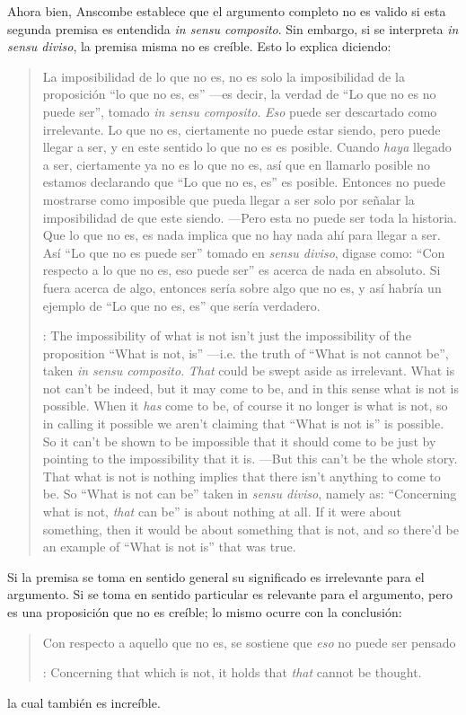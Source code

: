 Ahora bien, Anscombe establece que el argumento completo no es valido si esta segunda premisa es entendida \emph{in sensu composito}. Sin embargo, si se interpreta \emph{in sensu diviso}, la premisa misma no es creíble. Esto lo explica diciendo: \blockquote[{\cite[vii]{anscombe1981parmenides}}: The impossibility of what is not isn't just the impossibility of the proposition ``What is not, is'' ---i.e. the truth of ``What is not cannot be'', taken \emph{in sensu composito}. \emph{That} could be swept aside as irrelevant. What is not can't be indeed, but it may come to be, and in this sense what is not is possible. When it \emph{has} come to be, of course it no longer is what is not, so in calling it possible we aren't claiming that ``What is not is'' is possible. So it can't be shown to be impossible that it should come to be just by pointing to the impossibility that it is. ---But this can't be the whole story. That what is not is nothing implies that there isn't anything to come to be. So ``What is not can be'' taken in \emph{sensu diviso}, namely as: ``Concerning what is not, \emph{that} can be'' is about nothing at all. If it were about something, then it would be about something that is not, and so there'd be an example of ``What is not is'' that was true.]{La imposibilidad de lo que no es, no es solo la imposibilidad de la proposición ``lo que no es, es'' ---es decir, la verdad de ``Lo que no es no puede ser'', tomado \emph{in sensu composito}. \emph{Eso} puede ser descartado como irrelevante. Lo que no es, ciertamente no puede estar siendo, pero puede llegar a ser, y en este sentido lo que no es es posible. Cuando \emph{haya} llegado a ser, ciertamente ya no es lo que no es, así que en llamarlo posible no estamos declarando que ``Lo que no es, es'' es posible. Entonces no puede mostrarse como imposible que pueda llegar a ser solo por señalar la imposibilidad de que este siendo. ---Pero esta no puede ser toda la historia. Que lo que no es, es nada implica que no hay nada ahí para llegar a ser. Así ``Lo que no es puede ser'' tomado en \emph{sensu diviso}, digase como: ``Con respecto a lo que no es, eso puede ser'' es acerca de nada en absoluto. Si fuera acerca de algo, entonces sería sobre algo que no es, y así habría un ejemplo de ``Lo que no es, es'' que sería verdadero.} Si la premisa se toma en sentido general su significado es irrelevante para el argumento. Si se toma en sentido particular es relevante para el argumento, pero es una proposición que no es creíble; lo mismo ocurre con la conclusión: \blockquote[{\cite[3]{anscombe1981parmenides:pmc}}: Concerning that which is not, it holds that \emph{that} cannot be thought.]{Con respecto a aquello que no es, se sostiene que \emph{eso} no puede ser pensado} la cual también es increíble.

